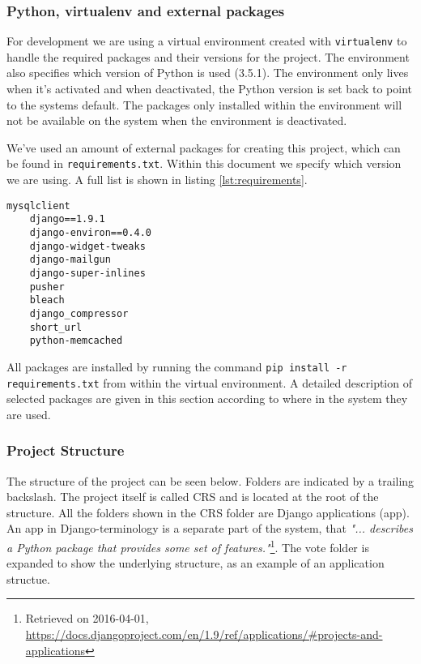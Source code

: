 \subsubsection*{Python, virtualenv and external packages}
For development we are using a virtual environment created with \texttt{virtualenv} to handle the required packages and their versions for the project. The environment also specifies which version of Python is used (3.5.1). The environment only lives when it's activated and when deactivated, the Python version is set back to point to the systems default. The packages only installed within the environment will not be available on the system when the environment is deactivated. 

We've used an amount of external packages for creating this project, which can be found in \texttt{requirements.txt}. Within this document we specify which version we are using. A full list is shown in listing \ref{lst:requirements}.

\begin{lstlisting}[caption=The requirements.txt file. A omitted version number means the newest one is used., label=lst:requirements]
    mysqlclient
    django==1.9.1
    django-environ==0.4.0
    django-widget-tweaks
    django-mailgun
    django-super-inlines
    pusher
    bleach
    django_compressor
    short_url
    python-memcached
\end{lstlisting}

All packages are installed by running the command \texttt{pip install -r requirements.txt} from within the virtual environment. A detailed description of selected packages are given in this section according to where in the system they are used.

\subsubsection*{Project Structure}
The structure of the project can be seen below. Folders are indicated by a trailing backslash. The project itself is called CRS and is located at the root of the structure. All the folders shown in the CRS folder are Django applications (app). An app in Django-terminology is a separate part of the system, that \emph{"... describes a Python package that provides some set of features."}\footnote{Retrieved on 2016-04-01, \url{https://docs.djangoproject.com/en/1.9/ref/applications/\#projects-and-applications}}. The vote folder is expanded to show the underlying structure, as an example of an application structue.

